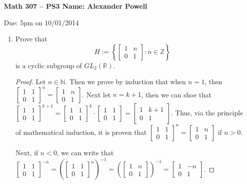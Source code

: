 \documentclass[a4paper]{article}
\begin{document}
\textbf{Math 307 -- PS3 \hfill Name: Alexander Powell}

Due: 5pm on 10/01/2014

\begin{enumerate}[leftmargin=*, label=(\textbf{\arabic*})]
\item  Prove that 
\[ H:= \left\{ \begin{bmatrix} 1 & n \\ 0 & 1 \end{bmatrix} : n \in \mathbb{Z} \right\} \] 
is a cyclic subgroup of $GL_2 (\mathbb{R})$.


\begin{proof}

Let $n \in \mathbb{N}$.  Then we prove by induction that when $n = 1$, then $\begin{bmatrix} 1 & 1 \\ 0 & 1 \end{bmatrix}^{n}=\begin{bmatrix} 1 & n \\ 0 & 1 \end{bmatrix}$.  Next let $n=k+1$, then we can shoe that $\begin{bmatrix} 1 & 1 \\ 0 & 1 \end{bmatrix}^{k+1} = \begin{bmatrix} 1 & 1 \\ 0 & 1 \end{bmatrix}^{k} \cdot \begin{bmatrix} 1 & 1 \\ 0 & 1 \end{bmatrix} = \begin{bmatrix} 1 & k+1 \\ 0 & 1 \end{bmatrix}$.  Thus, via the principle of mathematical induction, it is proven that $\begin{bmatrix} 1 & 1 \\ 0 & 1 \end{bmatrix}^{n}=\begin{bmatrix} 1 & n \\ 0 & 1 \end{bmatrix}$ if $n > 0$.  

Next, if $n < 0$, we can write that $\begin{bmatrix} 1 & 1 \\ 0 & 1 \end{bmatrix}^{-n} = (\begin{bmatrix} 1 & 1 \\ 0 & 1 \end{bmatrix}^{n})^{-1} = (\begin{bmatrix} 1 & n \\ 0 & 1 \end{bmatrix})^{-1} = \begin{bmatrix} 1 & -n \\ 0 & 1 \end{bmatrix}$.  


\end{proof}
\end{enumerate}
\end{document}
